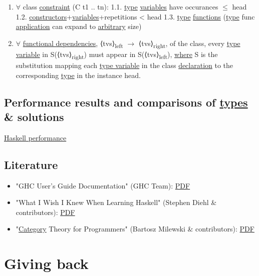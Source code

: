 \documentclass[a4paper,14pt,oneside]{book}
\begin{document}
\begin{enumerate}
\item \(\forall\) class \hyperref[org3e9130e]{constraint} (C t1 .. tn):
1.1. \hyperref[orgd9ae293]{type} \hyperref[orgd9d67f6]{variables} have occurances \(\le\) head
1.2. \hyperref[org19e8b2e]{constructors}+\hyperref[orgd9d67f6]{variables}+repetitions < head
1.3. \textlnot{} \hyperref[orgd9ae293]{type} \hyperref[orgda4c4ab]{functions} (\hyperref[orgd9ae293]{type} func \hyperref[org4336a79]{application} can expand to \hyperref[orgc80bbf4]{arbitrary} size)
\item \(\forall\) \hyperref[org177d21f]{functional dependencies}, ⟨tvs⟩\textsubscript{left} \(\to\) ⟨tvs⟩\textsubscript{right}, of the class, every \hyperref[org01c3ed4]{type variable} in S(⟨tvs⟩\textsubscript{right}) must appear in S(⟨tvs⟩\textsubscript{left}), \hyperref[org883ab3e]{where} S is the substitution mapping each \hyperref[org01c3ed4]{type variable} in the class \hyperref[orgf39ceb5]{declaration} to the corresponding \hyperref[orgd9ae293]{type} in the instance head.
\end{enumerate}

\chapter{Performance results and comparisons of \hyperref[org787c804]{types} \& solutions}
\label{sec:orgc35c3f8}
\href{https://github.com/haskell-perf}{Haskell performance}

\chapter{Literature}
\label{sec:orgb08f94b}

\begin{itemize}
\item "GHC User’s Guide Documentation" (GHC Team): \href{https://downloads.haskell.org/\~ghc/latest/docs/users\_guide.pdf}{PDF}
\item "What I Wish I Knew When Learning Haskell" (Stephen Diehl \& contributors): \href{http://dev.stephendiehl.com/hask/tutorial.pdf}{PDF}
\item "\hyperref[org47992f4]{Category} Theory for Programmers" (Bartosz Milewski \& contributors): \href{https://s3.amazonaws.com/milewski-ctfp-pdf/category-theory-for-programmers.pdf}{PDF}
\end{itemize}

\part{Giving back}
\label{sec:org72d606b}
\end{document}

